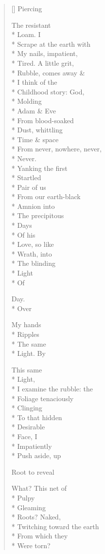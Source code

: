 \begin{verse}[\versewidth]
Piercing


The resistant\\*
Loam.   I\\*
Scrape at the earth with\\*
My nails, impatient,\\*
Tired.   A little grit,\\*
Rubble, comes away \&\\*
I think of the\\*
Childhood story: God, \\*
Molding\\*
Adam \& Eve\\*
From blood-soaked\\*
Dust, whittling\\*
Time \& space\\*
From never, nowhere, never,\\*
Never.\\*
Yanking the first\\*
Startled \\*
Pair of us\\*
From our earth-black\\*
Amnion     into\\*
The precipitous\\*
Days \\*
Of his\\*
Love, so like\\*
Wrath, into \\*
The blinding\\*
Light\\*
Of

Day.\\*
Over

My hands\\*
Ripples\\*
The same\\*
Light.    By


This same\\*
Light,\\*
I examine the rubble: the\\*
Foliage tenaciously\\*
Clinging\\*
To that hidden\\*
Desirable\\*
Face, I\\*
Impatiently\\*
Push aside, up

Root           to reveal

What?         This net of\\*
Pulpy\\*
Gleaming\\*
Roots?  Naked,\\*
Twitching toward the earth\\*
From which they\\*
Were torn?


\end{verse}
